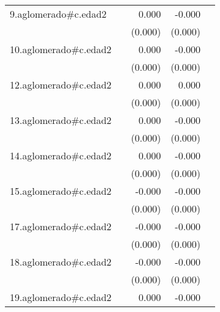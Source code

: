 {\begin{longtable}{l*{4}{D{.}{.}{-1}}}
\addlinespace
9.aglomerado#c.edad2&                     &       0.000         &      -0.000         &                     \\
            &                     &     (0.000)         &     (0.000)         &                     \\
\addlinespace
10.aglomerado#c.edad2&                     &       0.000         &      -0.000         &                     \\
            &                     &     (0.000)         &     (0.000)         &                     \\
\addlinespace
12.aglomerado#c.edad2&                     &       0.000         &       0.000         &                     \\
            &                     &     (0.000)         &     (0.000)         &                     \\
\addlinespace
13.aglomerado#c.edad2&                     &       0.000\sym{*}  &      -0.000         &                     \\
            &                     &     (0.000)         &     (0.000)         &                     \\
\addlinespace
14.aglomerado#c.edad2&                     &       0.000         &      -0.000         &                     \\
            &                     &     (0.000)         &     (0.000)         &                     \\
\addlinespace
15.aglomerado#c.edad2&                     &      -0.000         &      -0.000         &                     \\
            &                     &     (0.000)         &     (0.000)         &                     \\
\addlinespace
17.aglomerado#c.edad2&                     &      -0.000         &      -0.000\sym{*}  &                     \\
            &                     &     (0.000)         &     (0.000)         &                     \\
\addlinespace
18.aglomerado#c.edad2&                     &      -0.000         &      -0.000\sym{***}&                     \\
            &                     &     (0.000)         &     (0.000)         &                     \\
\addlinespace
19.aglomerado#c.edad2&                     &       0.000         &      -0.000         &                     \\

\end{longtable}}
